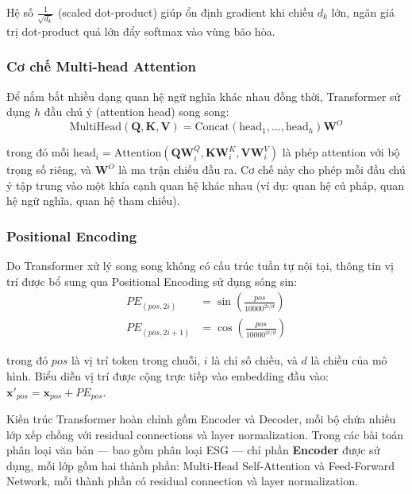 \noindent Hệ số $\frac{1}{\sqrt{d_k}}$ (scaled dot-product) giúp ổn định gradient khi chiều $d_k$ lớn, ngăn giá trị dot-product quá lớn đẩy softmax vào vùng bão hòa.


\subsubsection{Cơ chế Multi-head Attention}

Để nắm bắt nhiều dạng quan hệ ngữ nghĩa khác nhau đồng thời, Transformer sử dụng $h$ đầu chú ý (attention head) song song:
\begin{equation}
    \text{MultiHead}(\mathbf{Q}, \mathbf{K}, \mathbf{V}) = \text{Concat}(\text{head}_1, \ldots, \text{head}_h)\mathbf{W}^O
\end{equation}

\noindent trong đó mỗi $\text{head}_i = \text{Attention}(\mathbf{Q}\mathbf{W}_i^Q, \mathbf{K}\mathbf{W}_i^K, \mathbf{V}\mathbf{W}_i^V)$ là phép attention với bộ trọng số riêng, và $\mathbf{W}^O$ là ma trận chiếu đầu ra. Cơ chế này cho phép mỗi đầu chú ý tập trung vào một khía cạnh quan hệ khác nhau (ví dụ: quan hệ cú pháp, quan hệ ngữ nghĩa, quan hệ tham chiếu).


\subsubsection{Positional Encoding}

Do Transformer xử lý song song không có cấu trúc tuần tự nội tại, thông tin vị trí được bổ sung qua Positional Encoding sử dụng sóng sin:
\begin{align}
    PE_{(pos, 2i)} &= \sin\left(\frac{pos}{10000^{2i/d}}\right) \\
    PE_{(pos, 2i+1)} &= \cos\left(\frac{pos}{10000^{2i/d}}\right)
\end{align}

\noindent trong đó $pos$ là vị trí token trong chuỗi, $i$ là chỉ số chiều, và $d$ là chiều của mô hình. Biểu diễn vị trí được cộng trực tiếp vào embedding đầu vào: $\mathbf{x}'_{pos} = \mathbf{x}_{pos} + PE_{pos}$.

Kiến trúc Transformer hoàn chỉnh gồm Encoder và Decoder, mỗi bộ chứa nhiều lớp xếp chồng với residual connections và layer normalization. Trong các bài toán phân loại văn bản --- bao gồm phân loại ESG --- chỉ phần \textbf{Encoder} được sử dụng, mỗi lớp gồm hai thành phần: Multi-Head Self-Attention và Feed-Forward Network, mỗi thành phần có residual connection và layer normalization.


